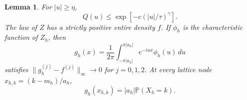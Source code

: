 \documentclass[11pt]{article}
\newtheorem{lemma}[theorem]{Lemma}
\newcommand{\Pp}{\mathbb P}
\begin{document}
\begin{lemma}\label{lem:density}
For $|u|\ge\eta$,
\begin{equation}\label{eq:limit-tail}
 Q(u)\le\exp[-c(|u|/\tau)^\gamma].
\end{equation}
The law of $Z$ has a strictly positive entire density $f$.
If $\phi_h$ is the characteristic function of $Z_h$, then
\begin{equation}\label{eq:interpolant}
 g_h(x)=\frac1{2\pi}\int_{-\pi|a_h|}^{\pi|a_h|}
                         e^{-iux}\phi_h(u)\,du
\end{equation}
satisfies $\|g_h^{(j)}-f^{(j)}\|_\infty\to0$ for $j=0,1,2$.
At every lattice node $x_{h,k}=(k-m_h)/a_h$,
\begin{equation}\label{eq:nodes}
 g_h(x_{h,k})=|a_h|\Pp(X_h=k).
\end{equation}
\end{lemma}
\end{document}
